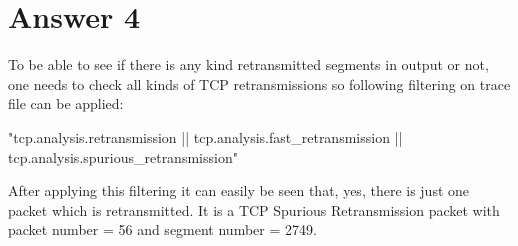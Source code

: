 \documentclass[10pt]{article}
\begin{document}
\section*{Answer 4}
\hspace{4mm}	
To be able to see if there is any kind retransmitted segments in output or not, one needs to check all kinds of TCP retransmissions so following filtering on trace file can be applied:
\begin{center}
"tcp.analysis.retransmission || tcp.analysis.fast\_retransmission || tcp.analysis.spurious\_retransmission"
\end{center}
After applying this filtering it can easily be seen that, yes, there is just one packet which is retransmitted. It is a TCP Spurious Retransmission packet with packet number = 56 and segment number = 2749.
\end{document}
